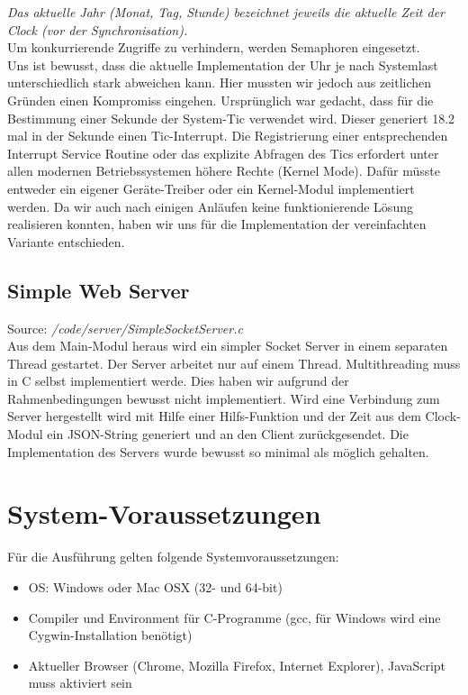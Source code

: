 \textit{Das aktuelle Jahr (Monat, Tag, Stunde) bezeichnet jeweils die aktuelle Zeit der Clock (vor der Synchronisation).}\\

Um konkurrierende Zugriffe zu verhindern, werden Semaphoren eingesetzt.\\

Uns ist bewusst, dass die aktuelle Implementation der Uhr je nach Systemlast unterschiedlich stark abweichen kann. Hier mussten wir jedoch aus zeitlichen Gründen einen Kompromiss eingehen. Ursprünglich war gedacht, dass für die Bestimmung einer Sekunde der System-Tic verwendet wird. Dieser generiert 18.2 mal in der Sekunde einen  Tic-Interrupt. Die Registrierung einer entsprechenden Interrupt Service Routine oder das explizite Abfragen des Tics erfordert unter allen modernen Betriebssystemen höhere Rechte (Kernel Mode). Dafür müsste entweder ein eigener Geräte-Treiber oder ein Kernel-Modul implementiert werden. Da wir auch nach einigen Anläufen keine funktionierende Lösung realisieren konnten, haben wir uns für die Implementation der vereinfachten Variante entschieden.

\subsection{Simple Web Server}
Source: \textit{/code/server/SimpleSocketServer.c}\\
Aus dem Main-Modul heraus wird ein simpler Socket Server in einem separaten Thread gestartet. Der Server arbeitet nur auf einem Thread. Multithreading muss in C selbst implementiert werde. Dies haben wir aufgrund der Rahmenbedingungen bewusst nicht implementiert. Wird eine Verbindung zum Server hergestellt wird mit Hilfe einer Hilfs-Funktion und der Zeit aus dem Clock-Modul ein JSON-String generiert und an den Client zurückgesendet. Die Implementation des Servers wurde bewusst so minimal als möglich gehalten.

\section{System-Voraussetzungen}
Für die Ausführung gelten folgende Systemvoraussetzungen:

\begin{itemize}
\item OS: Windows oder Mac OSX (32- und 64-bit)
\item Compiler und Environment für C-Programme (gcc, für Windows wird eine Cygwin-Installation benötigt)
\item Aktueller Browser (Chrome, Mozilla Firefox, Internet Explorer), JavaScript muss aktiviert sein
\end{itemize}

